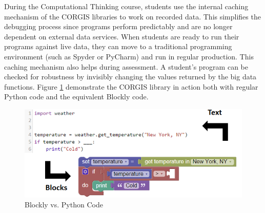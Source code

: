 During the Computational Thinking course, students use the internal caching mechanism of the CORGIS libraries to work on recorded data.
This simplifies the debugging process since programs perform predictably and are no longer dependent on external data services.
When students are ready to run their programs against live data, they can move to a traditional programming environment (such as Spyder or PyCharm) and run in regular production.
This caching mechanism also helps during assessment. A student's program can be checked for robustness by invisibly changing the values returned by the big data functions.
Figure \ref{fig-example-blockly} demonstrate the CORGIS library in action both with regular Python code and the equivalent Blockly code.

\begin{figure}
		\begin{center}
                \includegraphics[width=.75\linewidth]{images/mltExample.png}
		\end{center}
\caption{Blockly vs. Python Code}
\label{fig-example-blockly}
\centering
\end{figure}

